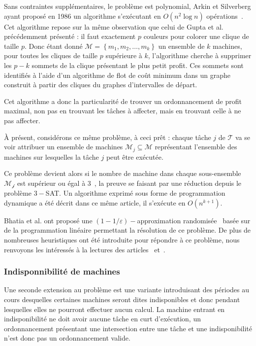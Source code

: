 \documentclass[a4paper,11pt]{article}
\begin{document}
Sans contraintes supplémentaires, le problème est polynomial, Arkin et Silverberg ayant proposé en
1986 un algorithme s'exécutant en $O(n^2 \log n)$ opérations~\cite{arkin_scheduling_1987}. Cet
algorithme repose sur la même observation que celui de Gupta et al. précédemment présenté : il faut
exactement $p$ couleurs pour colorer une clique de taille $p$. Donc étant donné $\mathcal{M}=\left\{
m_1, m_2, \dots, m_k \right\}$ un ensemble de $k$ machines, pour toutes les cliques de taille
$p$ supérieure à $k$, l'algorithme cherche à supprimer les $p -k$ sommets de la clique présentant
le plus petit profit. Ces sommets sont identifiés à l'aide d'un algorithme de flot de coût minimum
dans un graphe construit à partir des cliques du graphes d'intervalles de départ.

Cet algorithme a donc la particularité de trouver un ordonnancement de profit maximal, non pas en
trouvant les tâches à affecter, mais en trouvant celle à ne pas affecter.

À présent, considérons ce même problème, à ceci prêt : chaque tâche $j$ de $\mathcal{T}$ va se voir
attribuer un ensemble de machines $\mathcal{M}_j \subseteq \mathcal{M}$ représentant l'ensemble des
machines sur lesquelles la tâche $j$ peut être exécutée.

Ce problème devient alors \npc si le nombre de machine dans chaque sous-ensemble $\mathcal{M_j}$ est
supérieur ou égal à $3$~\cite{arkin_scheduling_1987}, la preuve se faisant par une réduction depuis
le problème \textsc{$3-$SAT}. Un algorithme exprimé sous forme de programmation dynamique a été
décrit dans ce même article, il s'exécute en $O(n^{k+1})$.

Bhatia et al. ont proposé une $(1 - 1/\varepsilon)-$approximation
randomisée~\cite{bhatia2003algorithmic} basée sur de la programmation linéaire permettant la
résolution de ce problème. De plus de nombreuses heuristiques ont été introduite pour répondre à ce
problème, nous renvoyons les intéressés à la lectures des articles~\cite{kroon1995exact}
et~\cite{gabrel1995scheduling}.

\subsubsection{Indisponnibilité de machines}

Une seconde extension au problème \bisched est une variante introduisant des périodes au cours
desquelles certaines machines seront dites indisponibles et donc pendant lesquelles elles ne
pourront effectuer aucun calcul. La machine entrant en indisponibilité ne doit avoir aucune tâche en
curt d'exécution, un ordonnancement présentant une intersection entre une tâche et une
indisponibilité n'est donc pas un ordonnancement valide.
\end{document}
